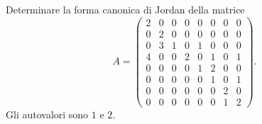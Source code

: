 \documentclass[a4paper]{article}
\begin{document}
\begin{radioactive}
\begin{snippetexercise}{}
    Determinare la forma canonica di Jordan della matrice
    \[
        A=
        \begin{pmatrix}
            2 & 0 & 0 & 0 & 0 & 0 & 0 & 0\\
            0 & 2 & 0 & 0 & 0 & 0 & 0 & 0\\
            0 & 3 & 1 & 0 & 1 & 0 & 0 & 0\\
            4 & 0 & 0 & 2 & 0 & 1 & 0 & 1\\
            0 & 0 & 0 & 0 & 1 & 2 & 0 & 0\\
            0 & 0 & 0 & 0 & 0 & 1 & 0 & 1\\
            0 & 0 & 0 & 0 & 0 & 0 & 2 & 0\\
            0 & 0 & 0 & 0 & 0 & 0 & 1 & 2
        \end{pmatrix}.
    \]
    Gli autovalori sono \(1\) e \(2\).
\end{snippetexercise}
\end{radioactive}
\end{document}
